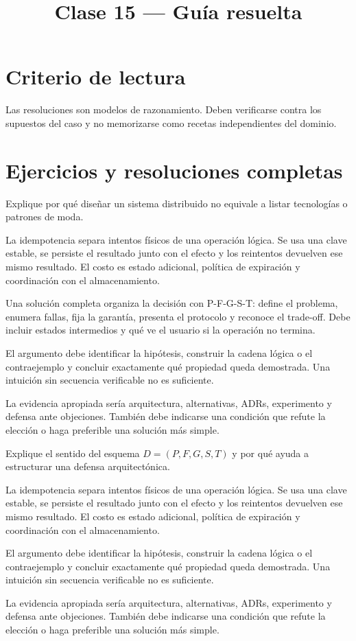\documentclass[variant=guia,cover=institutional,mode=screen]{ua-engineering-v6-article}
\title{Clase 15 --- Guía resuelta}
\author{\UAProfessor}
\date{\UADate}
\begin{document}
\section{Criterio de lectura}
Las resoluciones son modelos de razonamiento. Deben verificarse contra los supuestos del caso y no memorizarse como recetas independientes del dominio.

\section{Ejercicios y resoluciones completas}
\begin{uaexercise}
Explique por qué diseñar un sistema distribuido no equivale a listar tecnologías o patrones de moda.
\end{uaexercise}
\begin{uaanswer}
La idempotencia separa intentos físicos de una operación lógica. Se usa una clave estable, se persiste el resultado junto con el efecto y los reintentos devuelven ese mismo resultado. El costo es estado adicional, política de expiración y coordinación con el almacenamiento.

Una solución completa organiza la decisión con P-F-G-S-T: define el problema, enumera fallas, fija la garantía, presenta el protocolo y reconoce el trade-off. Debe incluir estados intermedios y qué ve el usuario si la operación no termina.

El argumento debe identificar la hipótesis, construir la cadena lógica o el contraejemplo y concluir exactamente qué propiedad queda demostrada. Una intuición sin secuencia verificable no es suficiente.

La evidencia apropiada sería arquitectura, alternativas, ADRs, experimento y defensa ante objeciones. También debe indicarse una condición que refute la elección o haga preferible una solución más simple.
\end{uaanswer}

\begin{uaexercise}
Explique el sentido del esquema $D=(P,F,G,S,T)$ y por qué ayuda a estructurar una defensa arquitectónica.
\end{uaexercise}
\begin{uaanswer}
La idempotencia separa intentos físicos de una operación lógica. Se usa una clave estable, se persiste el resultado junto con el efecto y los reintentos devuelven ese mismo resultado. El costo es estado adicional, política de expiración y coordinación con el almacenamiento.

El argumento debe identificar la hipótesis, construir la cadena lógica o el contraejemplo y concluir exactamente qué propiedad queda demostrada. Una intuición sin secuencia verificable no es suficiente.

La evidencia apropiada sería arquitectura, alternativas, ADRs, experimento y defensa ante objeciones. También debe indicarse una condición que refute la elección o haga preferible una solución más simple.
\end{uaanswer}
\end{document}
